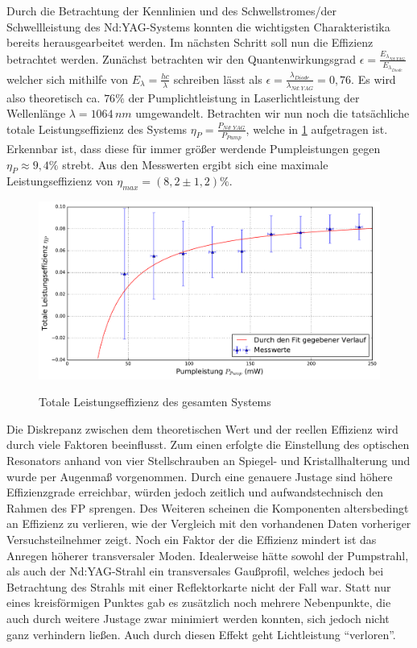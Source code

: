 \documentclass[twoside,colorback,accentcolor=tud4c,11pt]{tudreport}
\begin{document}
Durch die Betrachtung der Kennlinien und des Schwellstromes/der Schwellleistung des Nd:YAG-Systems konnten die wichtigsten Charakteristika bereits herausgearbeitet werden. Im nächsten Schritt soll nun die Effizienz betrachtet werden.
Zunächst betrachten wir den Quantenwirkungsgrad $\epsilon=\frac{E_{\lambda_{Nd:YAG}}}{E_{\lambda_{Diode}}}$ welcher sich mithilfe von $E_{\lambda}=\frac{hc}{\lambda}$ schreiben lässt als $\epsilon=\frac{\lambda_{Diode}}{\lambda_{Nd:YAG}}=0,76$. Es wird also theoretisch ca. $76\%$ der Pumplichtleistung in Laserlichtleistung der Wellenlänge $\lambda=1064\,\si{nm}$ umgewandelt. Betrachten wir nun noch die tatsächliche totale Leistungseffizienz des Systems $\eta_{P}=\frac{P_{Nd:YAG}}{P_{Pump}}$, welche in \ref{toleist} aufgetragen ist. Erkennbar ist, dass diese für immer größer werdende Pumpleistungen gegen $\eta_{P}\approx 9,4\%$ strebt.
Aus den Messwerten ergibt sich eine maximale Leistungseffizienz von $\eta_{max}=(8,2\pm 1,2)\%$.
\begin{figure}[H]
\centering
   	\begin{minipage}[b]{0.85\textwidth}
   	\includegraphics[width=\textwidth]{graphics/tot_leisteff.pdf}
  	\label{toleist}
   	\end{minipage}
\caption{Totale Leistungseffizienz des gesamten Systems}	
\end{figure}
Die Diskrepanz zwischen dem theoretischen Wert und der reellen Effizienz wird durch viele Faktoren beeinflusst. Zum einen erfolgte die Einstellung des optischen Resonators anhand von vier Stellschrauben an Spiegel- und Kristallhalterung und wurde per Augenmaß vorgenommen. Durch eine genauere Justage sind höhere Effizienzgrade erreichbar, würden jedoch zeitlich und aufwandstechnisch den Rahmen des FP sprengen. Des Weiteren scheinen die Komponenten altersbedingt an Effizienz zu verlieren, wie der Vergleich mit den vorhandenen Daten vorheriger Versuchsteilnehmer zeigt. Noch ein Faktor der die Effizienz mindert ist das Anregen höherer transversaler Moden. Idealerweise hätte sowohl der Pumpstrahl, als auch der Nd:YAG-Strahl ein transversales Gaußprofil, welches jedoch bei Betrachtung des Strahls mit einer Reflektorkarte nicht der Fall war. Statt nur eines kreisförmigen Punktes gab es zusätzlich noch mehrere Nebenpunkte, die auch durch weitere Justage zwar minimiert werden konnten, sich jedoch nicht ganz verhindern ließen. Auch durch diesen Effekt geht Lichtleistung "`verloren"'.
\pagebreak
\end{document}
